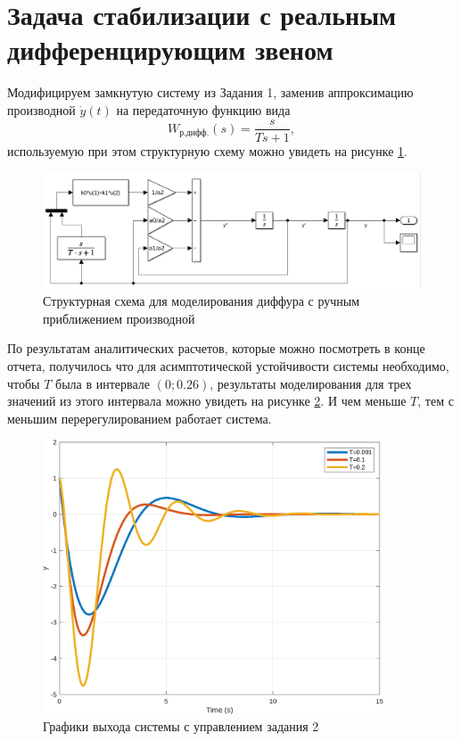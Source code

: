 \section{Задача стабилизации с реальным дифференцирующим звеном}

Модифицируем замкнутую систему из Задания 1, заменив аппроксимацию производной $\dot y(t)$
на передаточную функцию вида
\begin{equation*}
    W_{\text{р.дифф.}}(s)=\frac{s}{Ts+1},
\end{equation*}
используемую при этом структурную схему можно увидеть на рисунке \ref{fig:task_2_xls}.
\begin{figure}[H]
    \centering
    \includegraphics[width=1\textwidth]{figs/task_2_slx.png}
    \caption{Структурная схема для моделирования диффура с ручным приближением производной}
    \label{fig:task_2_xls}
\end{figure}
По результатам аналитических расчетов, которые можно посмотреть в конце
отчета, получилось что для асимптотической устойчивости
системы необходимо, чтобы $T$ была в интервале $(0;0.26)$, результаты 
моделирования для трех значений из этого интервала можно увидеть
на рисунке \ref{fig:task_2_out}. И чем меньше $T$, тем с меньшим
перерегулированием работает система. 
\begin{figure}[H]
    \centering
    \includegraphics[width=0.9\textwidth]{figs/task_2_out.png}
    \caption{Графики выхода системы с управлением задания 2}
    \label{fig:task_2_out}
\end{figure}




